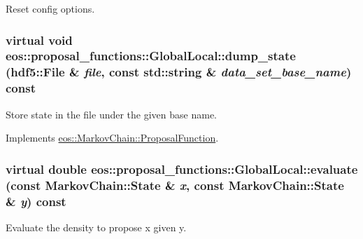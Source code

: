 Reset config options. \hypertarget{classeos_1_1proposal__functions_1_1GlobalLocal_a07d947ae2de101cc4ef13577d5d81ad5}{
\subsubsection[{dump\_\-state}]{\setlength{\rightskip}{0pt plus 5cm}virtual void eos::proposal\_\-functions::GlobalLocal::dump\_\-state ({\bf hdf5::File} \& {\em file}, \/  const std::string \& {\em data\_\-set\_\-base\_\-name}) const}}
\label{classeos_1_1proposal__functions_1_1GlobalLocal_a07d947ae2de101cc4ef13577d5d81ad5}


Store state in the file under the given base name. 

Implements \hyperlink{structeos_1_1MarkovChain_1_1ProposalFunction_aea88a1340e10cc6a5b03d8b5483774f7}{eos::MarkovChain::ProposalFunction}.\hypertarget{classeos_1_1proposal__functions_1_1GlobalLocal_ad1f7d7686225e665edd47cbd230483f6}{
\subsubsection[{evaluate}]{\setlength{\rightskip}{0pt plus 5cm}virtual double eos::proposal\_\-functions::GlobalLocal::evaluate (const {\bf MarkovChain::State} \& {\em x}, \/  const {\bf MarkovChain::State} \& {\em y}) const}}
\label{classeos_1_1proposal__functions_1_1GlobalLocal_ad1f7d7686225e665edd47cbd230483f6}


Evaluate the density to propose x given y. 

